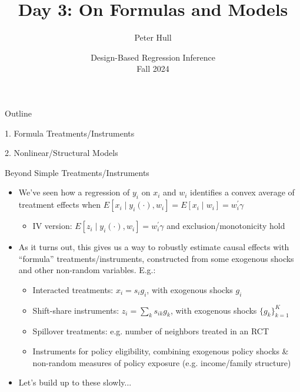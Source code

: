 \documentclass[11pt,english]{beamer}
\begin{document}
\begin{frame}[noframenumbering]{}
\vspace{0.5cm}
\title[]{Day 3: On Formulas and Models}
\author{Peter Hull}
\date{Design-Based Regression Inference \\Fall 2024} 
\titlepage {\small{}\ }\thispagestyle{empty} \vspace{-30pt}

\end{frame}
 

\begin{frame}{Outline}

1. Formula Treatments/Instruments
\vspace{0.8cm}

2. Nonlinear/Structural Models

\end{frame}

\begin{frame}{Beyond Simple Treatments/Instruments}

\begin{itemize}
\item We've seen how a regression of $y_i$ on $x_i$ and $w_i$ identifies a convex average of treatment effects when $E[x_i\mid y_i(\cdot),w_i]=E[x_i\mid w_i]=w_i^\prime\gamma$\smallskip
\begin{itemize}
\item IV version: $E[z_i\mid y_i(\cdot),w_i]=w_i^\prime\gamma$ and exclusion/monotonicity hold
\end{itemize}\bigskip\pause{}
\item As it turns out, this gives us a way to robustly estimate causal effects with ``formula'' treatments/instruments, constructed from some exogenous shocks and other non-random variables\pause{}. E.g.: \smallskip
\begin{itemize}
\item Interacted treatments: $x_i=s_ig_i$, with exogenous shocks $g_i$\smallskip\pause{}
\item Shift-share instruments: $z_i=\sum_k s_{ik} g_k$, with exogenous shocks $\{g_k\}_{k=1}^K$\smallskip\pause{}
\item Spillover treatments: e.g. number of neighbors treated in an RCT\smallskip\pause{}
\item Instruments for policy eligibility, combining exogenous policy shocks \& non-random measures of policy exposure (e.g. income/family structure)
\end{itemize}\bigskip\pause{}
\item Let's build up to these slowly...
\end{itemize}

\end{frame}
\end{document}

